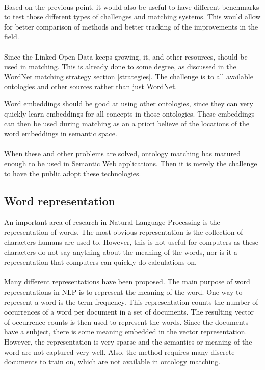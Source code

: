 \documentclass{article}
\begin{document}
 \paragraph{}
 Based on the previous point, it would also be useful to have different benchmarks to test those different types of challenges and matching systems. This would allow for better comparison of methods and better tracking of the improvements in the field.
 \paragraph{}
 Since the Linked Open Data keeps growing, it, and other resources, should be used in matching. This is already done to some degree, as discussed in the WordNet matching strategy section \ref{strategies}. The challenge is to all available ontologies and other sources rather than just WordNet.
 
 Word embeddings should be good at using other ontologies, since they can very quickly learn embeddings for all concepts in those ontologies. These embeddings can then be used during matching as an a priori believe of the locations of the word embeddings in semantic space.
 \paragraph{}
 When these and other problems are solved, ontology matching has matured enough to be used in Semantic Web applications. Then it is merely the challenge to have the public adopt these technologies.
 
 \subsection{Word representation} \label{w2v}
 An important area of research in Natural Language Processing is the representation of words. The most obvious representation is the collection of characters humans are used to. However, this is not useful for computers as these characters do not say anything about the meaning of the words, nor is it a representation that computers can quickly do calculations on.
 \paragraph{}
 Many different representations have been proposed. The main purpose of word representations in NLP is to represent the meaning of the word. One way to represent a word is the term frequency. This representation counts the number of occurrences of a word per document in a set of documents. The resulting vector of occurrence counts is then used to represent the words. Since the documents have a subject, there is some meaning embedded in the vector representation. However, the representation is very sparse and the semantics or meaning of the word are not captured very well. Also, the method requires many discrete documents to train on, which are not available in ontology matching.
\end{document}
